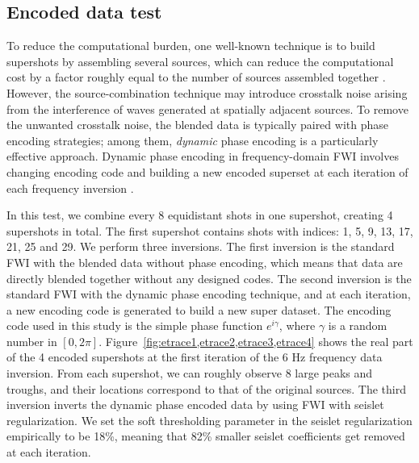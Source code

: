 \subsection{Encoded data test}

To reduce the computational burden, one well-known technique is to build supershots by assembling several sources, 
which can reduce the computational cost by a factor roughly equal to the number of sources assembled together \cite[]{morton98,romero00}.
However, the source-combination technique may introduce crosstalk noise arising from the interference of waves generated at spatially adjacent sources.
To remove the unwanted crosstalk noise, the blended data is typically paired with phase encoding strategies;
among them, \emph{dynamic} phase encoding \cite[]{krebs09,baumstein11,ben11} is a particularly effective approach.
Dynamic phase encoding in frequency-domain FWI involves changing encoding code 
and building a new encoded superset at each iteration of each frequency inversion \cite[]{ben11}.

In this test, we combine every 8 equidistant shots in one supershot, creating 4 supershots in total.
The first supershot contains shots with indices: 1, 5, 9, 13, 17, 21, 25 and 29.
We perform three inversions.
The first inversion is the standard FWI with the blended data without phase encoding, 
which means that data are directly blended together without any designed codes.
The second inversion is the standard FWI with the dynamic phase encoding technique, and at each iteration,
a new encoding code is generated to build a new super dataset. 
The encoding code used in this study is the simple phase function $e^{i\gamma}$, where $\gamma$ is a random number in $[0, 2\pi]$.
Figure~\ref{fig:etrace1,etrace2,etrace3,etrace4} shows the real part of the 4 encoded supershots at the first iteration of the 6 Hz frequency data inversion.
From each supershot, we can roughly observe 8 large peaks and troughs, and their locations correspond to that of the original sources.
The third inversion inverts the dynamic phase encoded data by using FWI with seislet regularization.
We set the soft thresholding parameter in the seislet regularization empirically to be 18\%, 
meaning that 82\% smaller seislet coefficients get removed at each iteration.

